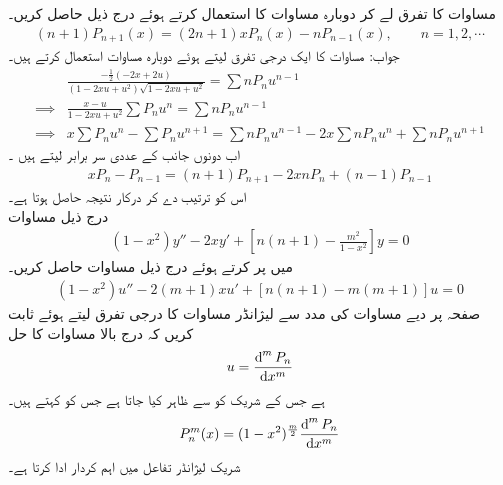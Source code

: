 مساوات  کا  تفرق لے کر دوبارہ مساوات  کا استعمال کرتے ہوئے  درج ذیل  حاصل کریں۔
\begin{align}
(n+1)P_{n+1}(x)=(2n+1)xP_n(x)-nP_{n-1}(x),\quad \quad n=1,2,\cdots
\end{align}
جواب: مساوات  کا ایک درجی تفرق  لیتے ہوئے دوبارہ مساوات  استعمال کرتے ہیں۔
\begin{align*}
& \frac{-\frac{1}{2}(-2x+2u)}{(1-2xu+u^2)\sqrt{1-2xu+u^2}}=\sum nP_nu^{n-1}\\
\implies & \frac{x-u}{1-2xu+u^2} \sum P_n u^n=\sum nP_n u^{n-1} \\
\implies & x\sum P_n u^n-\sum P_n u^{n+1}=\sum nP_n u^{n-1}-2x\sum nP_nu^n+\sum nP_nu^{n+1}
\end{align*}
اب دونوں جانب   کے عددی سر برابر لیتے ہیں ۔
\begin{align*}
xP_n-P_{n-1}=(n+1)P_{n+1}-2xnP_n+(n-1)P_{n-1}
\end{align*}
اس کو ترتیب دے کر درکار نتیجہ  حاصل ہوتا ہے۔
\quad {}\\
درج ذیل مساوات 
\begin{align}\label{مساوات_بیسل_شریک_لیژانڈر_الف}
(1-x^2)y''-2xy'+\left[n(n+1)-\frac{m^2}{1-x^2}\right]y=0
\end{align}
میں  پر کرتے ہوئے درج ذیل مساوات حاصل کریں۔
\begin{align}\label{مساوات_بیسل_شریک_لیژانڈر_ب}
(1-x^2)u''-2(m+1)xu'+[n(n+1)-m(m+1)]u=0
\end{align}
صفحہ  پر دیے مساوات  کی مدد سے لیژانڈر مساوات  کا  درجی تفرق  لیتے ہوئے ثابت کریں کہ درج بالا مساوات کا حل
\begin{align*}
u=\frac{\dif^{\,m}P_n}{\dif x^m}
\end{align*}
ہے جس کے شریک  کو  سے ظاہر کیا جاتا ہے جس کو  کہتے ہیں۔
\begin{align}
P_n^m(x) =(1-x^2)^{\frac{m}{2}}\frac{\dif^{\,m}P_n}{\dif x^m}
\end{align}
شریک لیژانڈر تفاعل  میں اہم کردار ادا کرتا ہے۔

